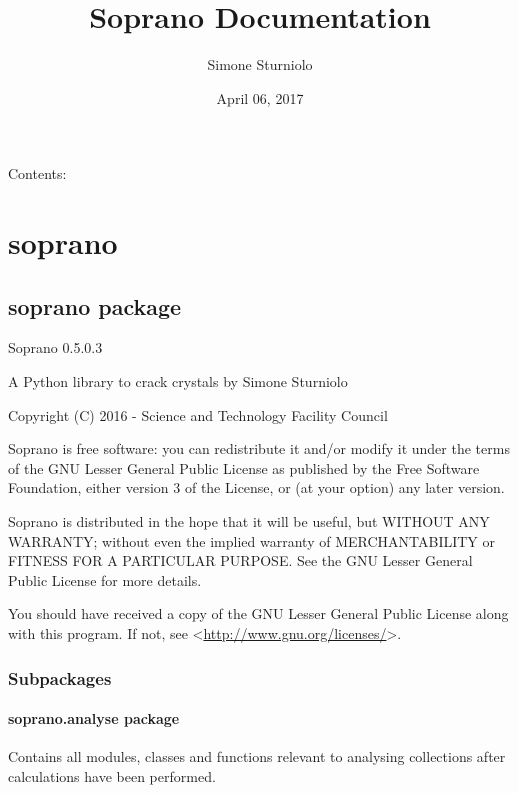 \documentclass[letterpaper,10pt,english]{sphinxmanual}
\title{Soprano Documentation}
\date{April 06, 2017}
\author{Simone Sturniolo}
\begin{document}
\maketitle
\tableofcontents
{}\label{index::doc}


Contents:


\chapter{soprano}
\label{doctree/modules:welcome-to-soprano-s-documentation-release-release}\label{doctree/modules:soprano}\label{doctree/modules::doc}

\section{soprano package}
\label{doctree/soprano:module-soprano}\label{doctree/soprano::doc}\label{doctree/soprano:soprano-package}
Soprano 0.5.0.3

A Python library to crack crystals
by Simone Sturniolo

Copyright (C) 2016 - Science and Technology Facility Council

Soprano is free software: you can redistribute it and/or modify
it under the terms of the GNU Lesser General Public License as published by
the Free Software Foundation, either version 3 of the License, or
(at your option) any later version.

Soprano is distributed in the hope that it will be useful,
but WITHOUT ANY WARRANTY; without even the implied warranty of
MERCHANTABILITY or FITNESS FOR A PARTICULAR PURPOSE.  See the
GNU Lesser General Public License for more details.

You should have received a copy of the GNU Lesser General Public License
along with this program.  If not, see \textless{}\href{http://www.gnu.org/licenses/}{http://www.gnu.org/licenses/}\textgreater{}.


\subsection{Subpackages}
\label{doctree/soprano:subpackages}

\subsubsection{soprano.analyse package}
\label{doctree/soprano.analyse:module-soprano.analyse}\label{doctree/soprano.analyse:soprano-analyse-package}\label{doctree/soprano.analyse::doc}
Contains all modules, classes and functions relevant
to analysing collections after calculations have been performed.
\end{document}
